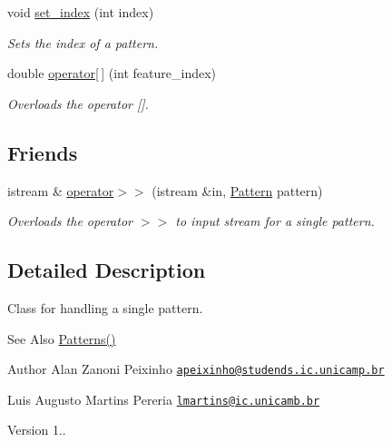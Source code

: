 \begin{DoxyCompactItemize}
void \hyperlink{classPattern_ad74cb513a6a76c20121297f2ab867a07}{set\+\_\+index} (int index)
\begin{DoxyCompactList}\small\item\em Sets the index of a pattern. \end{DoxyCompactList}\item 
double \hyperlink{classPattern_a979a9f332fc23c453659fc4d4d2ae8c5}{operator\mbox{[}$\,$\mbox{]}} (int feature\+\_\+index)
\begin{DoxyCompactList}\small\item\em Overloads the operator \mbox{[}\mbox{]}. \end{DoxyCompactList}\end{DoxyCompactItemize}
\subsection*{Friends}
\begin{DoxyCompactItemize}
\item 
istream \& \hyperlink{classPattern_a27ae4d6c06ab6d17ff9392ba3f5a5532}{operator$>$$>$} (istream \&in, \hyperlink{classPattern}{Pattern} pattern)
\begin{DoxyCompactList}\small\item\em Overloads the operator $>$$>$ to input stream for a single pattern. \end{DoxyCompactList}\end{DoxyCompactItemize}


\subsection{Detailed Description}
Class for handling a single pattern. 

\begin{DoxySeeAlso}{See Also}
\hyperlink{classPatterns}{Patterns()}
\end{DoxySeeAlso}
\begin{DoxyAuthor}{Author}
Alan Zanoni Peixinho \href{mailto:apeixinho@studends.ic.unicamp.br}{\tt apeixinho@studends.\+ic.\+unicamp.\+br} 

Luis Augusto Martins Pereria \href{mailto:lmartins@ic.unicamb.br}{\tt lmartins@ic.\+unicamb.\+br} 
\end{DoxyAuthor}
\begin{DoxyVersion}{Version}
1.. 
\end{DoxyVersion}


